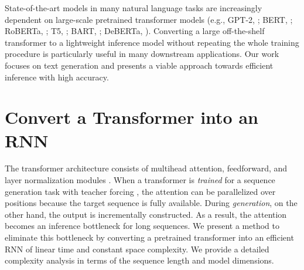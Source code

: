 \documentclass[11pt]{article}
\begin{document}
State-of-the-art models in many natural language tasks are increasingly dependent on large-scale pretrained transformer models (e.g., GPT-2, \citealp{gpt2}; BERT, \citealp{devlins2019bert}; RoBERTa, \citealp{Liu2019RoBERTaAR}; T5, \citealp{2020t5}; BART, \citealp{lewis-etal-2020-bart}; DeBERTa, \citealp{he2021deberta}). 
Converting a large off-the-shelf transformer to a lightweight inference model without repeating the whole training procedure is particularly useful in many downstream applications. 
Our work focuses on text generation and presents a viable approach towards efficient inference with high accuracy.





\section{Convert a Transformer into an RNN}
\label{T2RNN}
The transformer architecture consists of multihead attention, feedforward, and layer normalization modules \cite{Vaswani2017AttentionIA}.
When a transformer is \emph{trained} for a sequence generation task with teacher forcing \citep{teacher-forcing}, 
the attention can be parallelized over positions 
because the target sequence is fully available.
During \emph{generation}, on the other hand, the output is incrementally constructed.
As a result, the attention becomes an inference bottleneck for long sequences. We present a method to eliminate this bottleneck by converting a pretrained transformer into an efficient RNN of linear time and constant space complexity.
We provide a detailed complexity analysis in terms of the sequence length and model dimensions.
\end{document}
